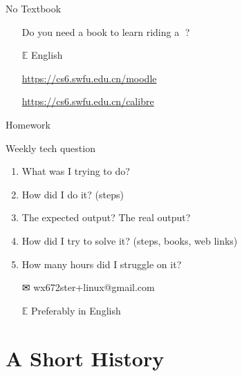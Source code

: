 \begin{frame}{No Textbook}%
  \begin{itemize}
  \item[\nerd{}] Do you need a book to learn riding a\hspace{.5ex} {\nerd }?
  \item[{\GG}]\google
  \item[$\mathbb{E}$] {\purisa English}
  \item[\moodle] \url{https://cs6.swfu.edu.cn/moodle}
  \item[{\small\openbook}] \url{https://cs6.swfu.edu.cn/calibre}
  \end{itemize}
\end{frame}

\begin{frame}{Homework}
  \begin{block}{Weekly tech question}
    \begin{enumerate}
    \item What was I trying to do?
    \item How did I do it? (steps)
    \item The expected output? The real output?
    \item How did I try to solve it? (steps, books, web links)
    \item How many hours did I struggle on it?
    \end{enumerate}
  \end{block}
  \begin{itemize}
  \item[\Large\dejavu ✉] \alert{\ttfamily wx672ster+linux@gmail.com}
  \item[$\mathbb{E}$] Preferably in English
  \end{itemize}
\end{frame}

\section[History]{A Short History}

